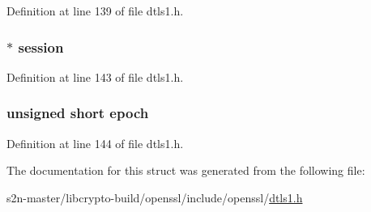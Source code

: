Definition at line 139 of file dtls1.\+h.

\subsubsection[{\texorpdfstring{session}{session}}]{ $\ast$ session}\hypertarget{structdtls1__retransmit__state_a256a14c1af5a5311e78f1037d7ee2274}{}\label{structdtls1__retransmit__state_a256a14c1af5a5311e78f1037d7ee2274}


Definition at line 143 of file dtls1.\+h.

\subsubsection[{\texorpdfstring{epoch}{epoch}}]{\setlength{\rightskip}{0pt plus 5cm}unsigned short epoch}\hypertarget{structdtls1__retransmit__state_a4675237d0516bb5e6482bcc153326f91}{}\label{structdtls1__retransmit__state_a4675237d0516bb5e6482bcc153326f91}


Definition at line 144 of file dtls1.\+h.



The documentation for this struct was generated from the following file\+:\begin{DoxyCompactItemize}
\item 
s2n-\/master/libcrypto-\/build/openssl/include/openssl/\hyperlink{include_2openssl_2dtls1_8h}{dtls1.\+h}\end{DoxyCompactItemize}
